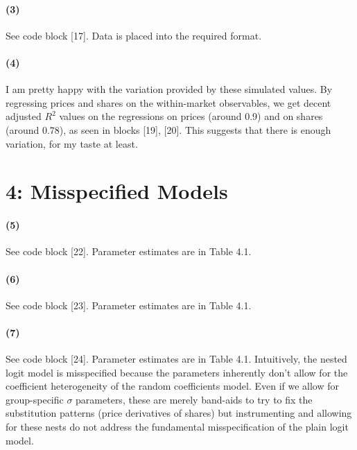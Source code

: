 \documentclass[10pt,letter]{article}
\begin{document}
\paragraph{(3)} See code block [17]. Data is placed into the required format.
\paragraph{(4)} I am pretty happy with the variation provided by these simulated values. By regressing prices and shares on the within-market observables, we get decent adjusted $R^2$ values on the regressions on prices (around 0.9) and on shares (around 0.78), as seen in blocks [19], [20]. This suggests that there is enough variation, for my taste at least.
\pagebreak
\section*{4: Misspecified Models}

\paragraph{(5)} See code block [22]. Parameter estimates are in Table 4.1.
\paragraph{(6)} See code block [23]. Parameter estimates are in Table 4.1.
\paragraph{(7)} See code block [24]. Parameter estimates are in Table 4.1. Intuitively, the nested logit model is misspecified because the parameters inherently don't allow for the coefficient heterogeneity of the random coefficients model. Even if we allow for group-specific $\sigma$ parameters, these are merely band-aids to try to fix the substitution patterns (price derivatives of shares) but instrumenting and allowing for these nests do not address the fundamental misspecification of the plain logit model.
\end{document}
